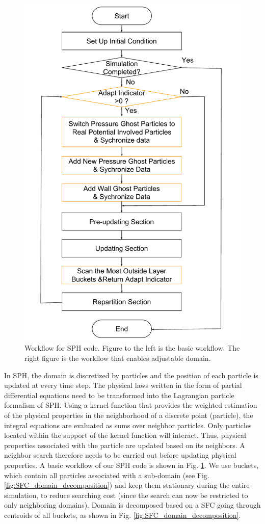 \documentclass[procedia]{easychair}
\begin{document}
\begin{figure}[!t]
\includegraphics[scale=0.28]{Work_flow_adjust}
\caption{Workflow for SPH code. Figure to the left is the basic workflow. The right figure is the workflow that enables adjustable domain.}
\label{fig:Work_flow}
\end{figure}
In SPH, the domain is discretized by particles and the position of each particle is updated at every time step. The physical laws written in the form of partial differential equations need to be transformed into the Lagrangian particle formalism of SPH. Using a kernel function that provides the weighted estimation of the physical properties in the neighborhood of a discrete point (particle), the integral equations are evaluated as sums over neighbor particles. Only particles located within the support of the kernel function will interact. Thus, physical properties associated with the particle are updated based on its neighbors. A neighbor search therefore needs to be carried out before updating physical properties. A basic workflow of our SPH code is shown in Fig. \ref{fig:Work_flow}. We use buckets, which contain all particles associated with a sub-domain (see Fig. \ref{fig:SFC_domain_decomposition}) 
and keep them stationary during the entire simulation, to reduce searching cost (since the search can now be restricted to only neighboring domains).
Domain is decomposed based on a SFC going through centroids of all buckets, as shown in Fig. \ref{fig:SFC_domain_decomposition}.
\end{document}
